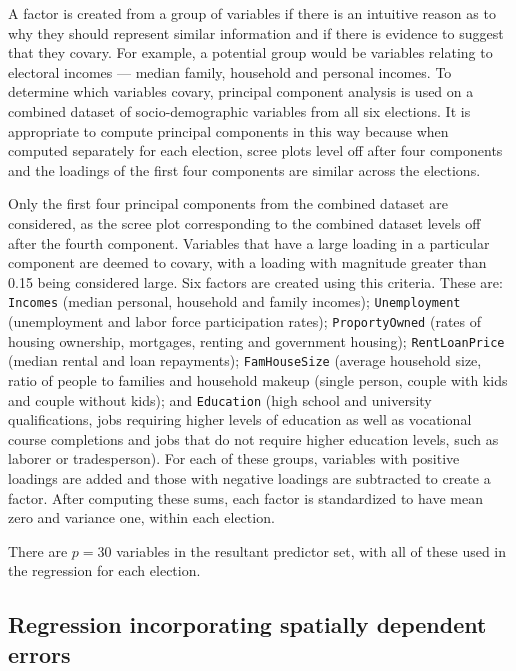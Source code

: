 \documentclass[11pt,a4paper,]{article}
\begin{document}
A factor is created from a group of variables if there is an intuitive
reason as to why they should represent similar information and if there
is evidence to suggest that they covary. For example, a potential group
would be variables relating to electoral incomes --- median family,
household and personal incomes. To determine which variables covary,
principal component analysis is used on a combined dataset of
socio-demographic variables from all six elections. It is appropriate to
compute principal components in this way because when computed
separately for each election, scree plots level off after four
components and the loadings of the first four components are similar
across the elections.

Only the first four principal components from the combined dataset are
considered, as the scree plot corresponding to the combined dataset
levels off after the fourth component. Variables that have a large
loading in a particular component are deemed to covary, with a loading
with magnitude greater than 0.15 being considered large. Six factors are
created using this criteria. These are: \texttt{Incomes} (median
personal, household and family incomes); \texttt{Unemployment}
(unemployment and labor force participation rates);
\texttt{ProportyOwned} (rates of housing ownership, mortgages, renting
and government housing); \texttt{RentLoanPrice} (median rental and loan
repayments); \texttt{FamHouseSize} (average household size, ratio of
people to families and household makeup (single person, couple with kids
and couple without kids); and \texttt{Education} (high school and
university qualifications, jobs requiring higher levels of education as
well as vocational course completions and jobs that do not require
higher education levels, such as laborer or tradesperson). For each of
these groups, variables with positive loadings are added and those with
negative loadings are subtracted to create a factor. After computing
these sums, each factor is standardized to have mean zero and variance
one, within each election.

There are \(p=30\) variables in the resultant predictor set, with all of
these used in the regression for each election.

\subsection{Regression incorporating spatially dependent
errors}\label{regression-incorporating-spatially-dependent-errors}
\end{document}
